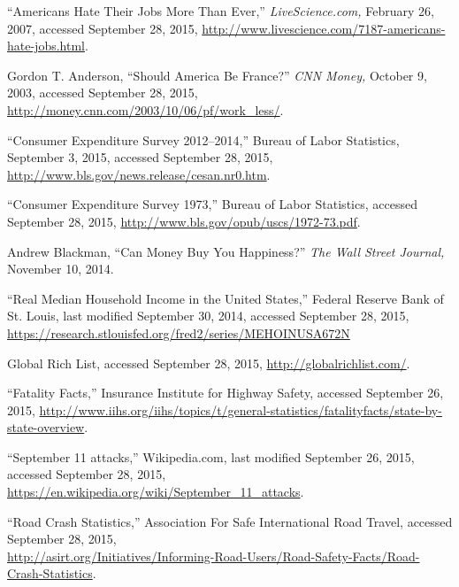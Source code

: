 \begin{thebibliography}{99}

``Americans Hate Their Jobs More Than Ever,''
\emph{LiveScience.com,}
February 26, 2007,
accessed September 28, 2015,
\url{http://www.livescience.com/7187-americans-hate-jobs.html}.

Gordon T. Anderson,
``Should America Be France?''
\emph{CNN Money,}
October 9, 2003,
accessed September 28, 2015,
\url{http://money.cnn.com/2003/10/06/pf/work\_less/}.

``Consumer Expenditure Survey 2012--2014,''
Bureau of Labor Statistics,
September 3, 2015,
accessed September 28, 2015,
\url{http://www.bls.gov/news.release/cesan.nr0.htm}.

``Consumer Expenditure Survey 1973,''
Bureau of Labor Statistics,
accessed September 28, 2015,
\url{http://www.bls.gov/opub/uscs/1972-73.pdf}.

Andrew Blackman,
``Can Money Buy You Happiness?''
\emph{The Wall Street Journal,}
November 10, 2014.

``Real Median Household Income in the United States,''
Federal Reserve Bank of St. Louis,
last modified September 30, 2014,
accessed September 28, 2015,
\url{https://research.stlouisfed.org/fred2/series/MEHOINUSA672N}

Global Rich List,
accessed September 28, 2015,
\url{http://globalrichlist.com/}.

``Fatality Facts,''
Insurance Institute for Highway Safety,
accessed September 26, 2015,
\url{http://www.iihs.org/iihs/topics/t/general-statistics/fatalityfacts/state-by-state-overview}.

``September 11 attacks,''
Wikipedia.com,
last modified September 26, 2015,
accessed September 28, 2015,
\url{https://en.wikipedia.org/wiki/September\_11\_attacks}.

``Road Crash Statistics,''
Association For Safe International Road Travel,
accessed September 28, 2015,\\
\url{http://asirt.org/Initiatives/Informing-Road-Users/Road-Safety-Facts/Road-Crash-Statistics}.


\end{thebibliography}
